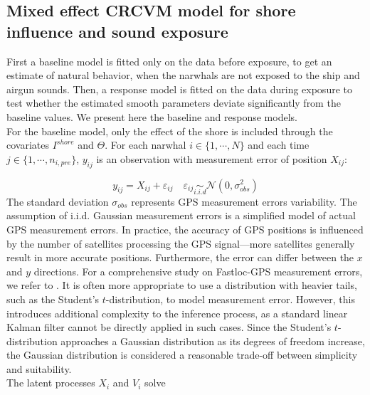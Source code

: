 \documentclass[aoas]{imsart}
\theoremstyle{definition}
\theoremstyle{remark}
\theoremstyle{remark}
\newcommand {\1}{\mathbb{1}}
\begin{document}
\subsection{Mixed effect CRCVM model for  shore influence and sound exposure}
\label{subsection: ship exposure effect}


First a baseline model is fitted only on the data before exposure, to get an estimate of natural behavior, when the narwhals are not exposed to the ship and airgun sounds. Then, a response model is fitted on the data during exposure to test whether the estimated smooth parameters deviate significantly from the baseline values. We present here the baseline and response models.\\

For the baseline model, only the effect of the shore is included through the covariates $I^{shore}$ and $\Theta$. For each narwhal $i \in \{1, \cdots, N\}$ and each time $j\in\{1, \cdots, n_{i,pre}\}$, $y_{ij}$ is an observation with measurement error of position $X_{ij}$:

\begin{equation}
	y_{ij}=X_{ij}+\varepsilon_{ij} \quad 
	\varepsilon_{ij} \underset{i.i.d}{\sim} \mathcal{N}(0,\sigma_{obs}^2)  
	\label{eq: baseline observations}
\end{equation}
The standard deviation $\sigma_{obs}$ represents GPS measurement errors variability. The assumption of i.i.d. Gaussian measurement errors is a simplified model of actual GPS measurement errors. In practice, the accuracy of GPS positions is influenced by the number of satellites processing the GPS signal—more satellites generally result in more accurate positions. Furthermore, the error can differ between the $x$ and $y$ directions. For a comprehensive study on Fastloc-GPS measurement errors, we refer to \citep{wensveen_path_2015}. It is often more appropriate to use a distribution with heavier tails, such as the Student's $t$-distribution, to model measurement error. However, this introduces additional complexity to the inference process, as a standard linear Kalman filter cannot be directly applied in such cases. Since the Student's $t$-distribution approaches a Gaussian distribution as its degrees of freedom increase, the Gaussian distribution is considered a reasonable trade-off between simplicity and suitability.\\

The latent processes $X_i$ and $V_i$ solve 
\end{document}
